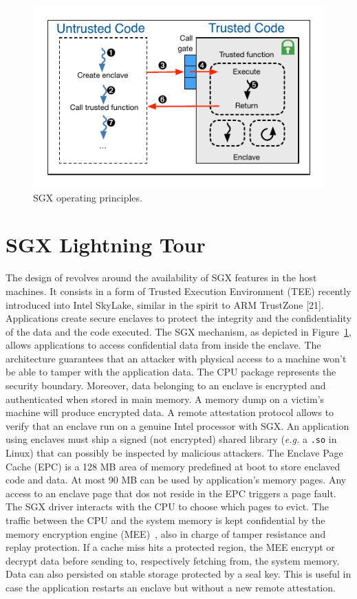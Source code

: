 \begin{figure}[!t]
  \centering
  \includegraphics[scale=0.8]{images/sgx.pdf}
  \caption{SGX operating principles.}
  \label{fig:sgx}
\end{figure}

\section{SGX Lightning Tour}
\label{sec:background}
The design of \SYS revolves around the availability of SGX features in the host machines. 
It consists in a form of Trusted Execution Environment (TEE) recently introduced into Intel SkyLake, similar in the spirit to ARM TrustZone [21]. 
Applications create secure enclaves to protect the integrity and the confidentiality of the data and the code executed. 
The SGX mechanism, as depicted in Figure~\ref{fig:sgx}, allows applications to access confidential data from inside the enclave. 
The architecture guarantees that an attacker with physical access to a machine won’t be able to tamper with the application data. 
The CPU package represents the security boundary. 
Moreover, data belonging to an enclave is encrypted and authenticated when stored in main memory. 
A memory dump on a victim’s machine will produce encrypted data. 
A remote attestation protocol allows to verify that an enclave run on a genuine Intel processor with SGX. 
An application using enclaves must ship a signed (not encrypted) shared library (\emph{e.g.} a \texttt{.so} in Linux) that can possibly be inspected by malicious attackers. 
The Enclave Page Cache (EPC) is a 128 MB area of memory predefined at boot to store enclaved code and data. 
At most 90 MB can be used by application’s memory pages. 
Any access to an enclave page that dos not reside in the EPC triggers a page fault. 
The SGX driver interacts with the CPU to choose which pages to evict. 
The traffic between the CPU and the system memory is kept confidential by the memory encryption engine (MEE)~\cite{gueron2016memory}, also in charge of tamper resistance and replay protection. 
If a cache miss hits a protected region, the MEE encrypt or decrypt data before sending to, respectively fetching from, the system memory. 
Data can also persisted on stable storage protected by a seal key. 
This is useful in case the application restarts an enclave but without a new remote attestation.

